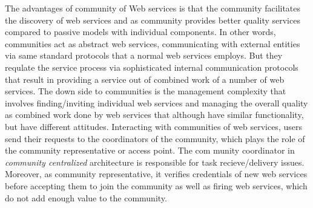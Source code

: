 \documentclass[10pt,journal,cspaper,compsoc]{IEEEtran}
\begin{document}
The advantages of community of Web services is that the community facilitates the discovery of web services and as community provides better quality services compared to passive models with individual components. In other words, communities act as abstract web services, communicating with external entities via same standard protocols that a normal web services employs. But they requlate the service process via sophisticated internal communication protocols that result in providing a service out of combined work of a number of web services. The down side to communities is the management complexity that involves finding/inviting individual web services and managing the overall quality as combined work done by web services that although have similar functionality, but have different attitudes. Interacting with communities of web services, users send their requests to the coordinators of the community, which plays the role of the community representative or access point. The com munity coordinator in \emph{community centralized} architecture is responsible for task recieve/delivery issues. Moreover, as community representative, it verifies credentials of new web services before accepting them to join the community as well as firing web services, which do not add enough value to the community.  
\end{document}
